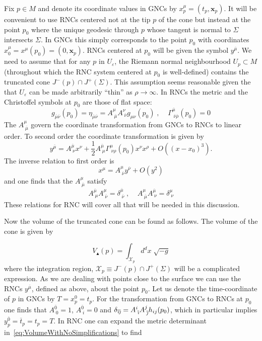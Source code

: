 \documentclass[12pt]{article}
\newcommand{\be}{\begin{equation}}
\newcommand{\ee}{\end{equation}}
\newcommand{\mb}[1]{\marginnote{\color{red}{\small MB:\,#1}}}
\newcommand{\ibar}{{\overline{\emph\i}}}
\newcommand{\jbar}{{\overline{\emph\j}}}
\begin{document}
Fix $p\in M$ and denote its coordinate values in GNCs by $x^\mu_p=(t_p,\mathbf x_p)$. It will be convenient to use RNCs centered not at the tip $p$ of the cone but instead at the point $p_0$ where the unique geodesic through $p$ whose tangent is normal to $\Sigma$ intersects $\Sigma$. In GNCs this simply corresponds to the point $p_0$ with coordinates $x_0^\mu=x^\mu(p_0)=(0,\mathbf x_p)$. RNCs centered at $p_0$ will be given the symbol $y^{\overline{\mu}}$.
We need to assume that for any $p$ in $U_\varepsilon$, the Riemann normal neighbourhood $U_p\subset M$ (throughout which the RNC system centered at $p_0$ is well-defined) contains the truncated cone $J^-(p)\cap J^+(\Sigma)$. This assumption seems reasonable given the that $U_\varepsilon$ can be made arbitrarily ``thin'' as $\rho\rightarrow\infty$. In RNCs the metric and the Christoffel symbols at $p_0$ are those of flat space:
\be\label{eq:RNCMetricTransAtPAndChris}
g_{\overline{\mu} \overline{\nu}}(p_0)=\eta_{\overline{\mu} \overline{\nu}}=A^{\mu}_{\;\overline{\mu}}A^{\nu}_{\;\overline{\nu}}g_{\mu\nu}(p_0)\;,\;\;\;\;\Gamma^{\overline{\mu}}_{\;\overline{\nu}\overline{\rho}}(p_0)=0
\ee
The $A^{\mu}_{\;\overline{\mu}}$ govern the coordinate transformation from GNCs to RNCs to linear order. %
To second order the coordinate transformation is given by
\be\label{eq:RNCtotaltrans}
y^{\overline{\mu}}=A^{\overline{\mu}}_{\;\nu}x^\nu+\frac{1}{2}A^{\overline{\mu}}_{\;\mu}\Gamma^{\mu}_{\;\nu\rho}(p_0)x^\nu x^\rho+O((x-x_0)^3).
\ee
The inverse relation to first order is 
\be\label{eq:RNCinversetrans}
x^{\mu}=A^{\mu}_{\;\overline{\nu}}y^{\overline{\nu}}+O(y^2)
\ee
and one finds that the $A^{\mu}_{\;\overline{\mu}}$ satisfy
\be\label{eq:RNCeqnforA}
A^{\overline{\mu}}_{\;\mu}A^{\mu}_{\;\overline{\nu}}=\delta^{\overline{\mu}}_{\;\overline{\nu}}\;,\;\;\;\;A^{\mu}_{\;\overline{\mu}}A^{\overline{\mu}}_{\;\nu}=\delta^{\mu}_{\;\nu}
\ee
These relations for RNC will cover all that will be needed in this discussion.

Now the volume of the truncated cone can be found as follows. 
The volume of the cone is given by

\be\label{eq:VolumeWithNoSimplifications}
V_\blacktriangle(p)=\int_{\mathcal{X}_p} d^d x\;\sqrt{-g}
\ee
where the integration region, $\mathcal{X}_p\equiv  J^-(p)\cap J^+(\Sigma)$ will be a complicated expression. As we are dealing with points close to the surface we can use the  RNCs $y^{\overline{\mu}}$, defined as above, about the point $p_0$. Let us denote the time-coordinate of $p$ in GNCs by $T=x^0_p=t_p$. For the transformation from GNCs to RNCs at $p_0$ one finds that $A^{\overline 0}_{\;0}=1$, $A^{\overline 0}_{\;i}=0$ and $\delta_{\ibar\jbar}=A^i_{\;\ibar}A^j_{\;\jbar}h_{ij}(p_0)$, which in particular implies $y^{\overline{0}}_p=\overline{t}_p=t_p=T$. In RNC one can expand the metric determinant in~\eqref{eq:VolumeWithNoSimplifications} to find
\end{document}
